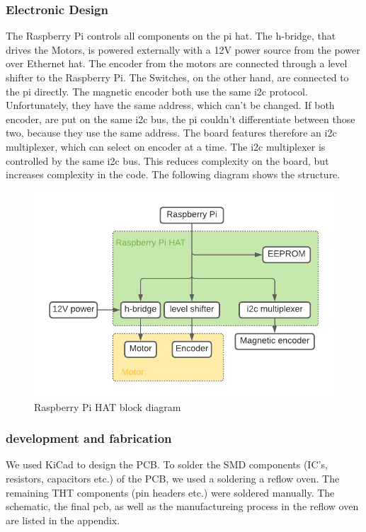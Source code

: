 \subsubsection{Electronic Design}

The Raspberry Pi controls all components on the pi hat. The h-bridge, that drives the Motors, is powered externally with a 12V power source from the power over Ethernet hat. The encoder from the motors are connected through a level shifter to the Raspberry Pi. The Switches, on the other hand, are connected to the pi directly. The magnetic encoder both use the same i2c protocol. Unfortunately, they have the same address, which can't be changed. If both encoder, are put on the same i2c bus, the pi couldn't differentiate between those two, because they use the same address. The board features therefore an i2c multiplexer, which can select on encoder at a time. The i2c multiplexer is controlled by the same i2c bus. This reduces complexity on the board, but increases complexity in the code. The following diagram shows the structure.

\begin{figure}[H]
	\centering
	\includegraphics[width=\linewidth]{../art/PCB Block diagram.pdf}
	\caption{Raspberry Pi HAT block diagram}
\end{figure}


\subsubsection{development and fabrication}


We used KiCad to design the PCB. To solder the SMD components (IC's, resistors, capacitors etc.) of the PCB, we used a soldering a reflow oven. The remaining THT components (pin headers etc.) were soldered manually. The schematic, the final pcb, as well as the manufactureing process in the reflow oven are listed in the appendix.

